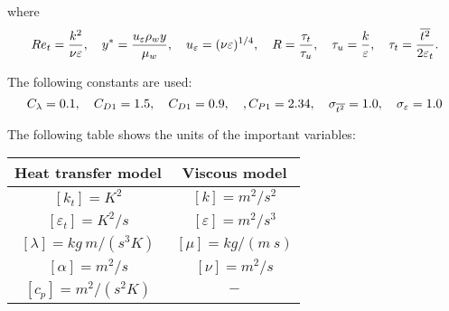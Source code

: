 where
\begin{equation}
Re_t = \frac{k^2}{\nu\varepsilon}, \quad y^*= \frac{u_\varepsilon \rho_w y}{\mu_w}, \quad u_\varepsilon = (\nu\varepsilon)^{1/4}, \quad R = \frac{\tau_t}{\tau_u}, \quad \tau_u = \frac{k}{{\varepsilon}}, \quad \tau_t = \frac{\overline{t^2}}{2{\varepsilon}_t}.
\end{equation}

The following constants are used:
\begin{equation}
C_\lambda=0.1, \quad C_{D1}=1.5, \quad C_{D1}=0.9, \quad, C_{P1}=2.34, \quad \sigma_{\overline{t^2}}=1.0, \quad \sigma_{{\varepsilon}}=1.0
\end{equation}


The following table shows the units of the important variables: 
\begin{center}
\begin{tabular}{ c | c }
Heat transfer model & Viscous model   \\ \hline
$\left[k_t\right]= K^2$ & $\left[k\right]= m^2 / s^2$  \\
$\left[\varepsilon_t\right]= K^2/s$ & $\left[\varepsilon\right]= m^2 / s^3$  \\ 
$\left[\lambda\right]= kg \ m / (s^3 K)$ & $\left[\mu\right]= kg /(m \ s)$  \\
$\left[\alpha\right]= m^2 /s $ & $\left[\nu\right]= m^2 /s$  \\ 
$\left[c_p\right]= m^2 /(s^2 K) $ & $-$  \\ \hline
\end{tabular}
\end{center}
